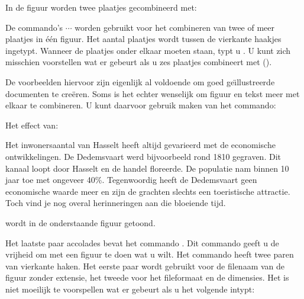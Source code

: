 In de figuur worden twee plaatjes gecombineerd met:


De commando's \type{\startcombinatie} $\cdots$
\type{\stopcombinatie} worden gebruikt voor het combineren
van twee of meer plaatjes in \'e\'en figuur. Het aantal
plaatjes wordt tussen de vierkante haakjes ingetypt. Wanneer
de plaatjes onder elkaar moeten staan, typt u \type{[1*2]}.
U kunt zich misschien voorstellen wat er gebeurt als u zes
plaatjes combineert met \type{[3*2]}
().

De voorbeelden hiervoor zijn eigenlijk al voldoende om goed
ge\"{\i}llustreerde documenten te cre\"eren. Soms is het echter
wenselijk om figuur en tekst meer met elkaar te combineren.
U kunt daarvoor gebruik maken van het commando:


Het effect van:

\startbuffer
{}
  {\externfiguur[ma-cb-18][breedte=.5\zetbreedte]}
  Het inwonersaantal van Hasselt heeft altijd
  gevarieerd met de economische ontwikkelingen. De
  Dedemsvaart werd bijvoorbeeld rond 1810 gegraven. Dit
  kanaal loopt door Hasselt en de handel floreerde. De
  populatie nam binnen 10 jaar toe met ongeveer 40\%.
  Tegenwoordig heeft de Dedemsvaart geen economische waarde
  meer en zijn de grachten slechts een toeristische
  attractie. Toch vind je nog overal herinneringen aan die
  bloeiende tijd.
\stopfiguurtekst
\stopbuffer

\typebuffer

wordt in de onderstaande figuur getoond.

\start
\steltolerantiein[zeersoepel]
\haalbuffer
\stop


Het laatste paar accolades bevat het commando
\type{\externfiguur}. Dit commando geeft u de vrijheid om
met een figuur te doen wat u wilt. Het commando
\type{\externfiguur} heeft twee paren van vierkante haken.
Het eerste paar wordt gebruikt voor de filenaam van de
figuur zonder extensie, het tweede voor het fileformaat en
de dimensies. Het is niet moeilijk te voorspellen wat er
gebeurt als u het volgende intypt:

\startbuffer[margefiguur]
\inmarge
  {\externfiguur
     [ma-cb-23]
     [breedte=\margebreedte]}
\stopbuffer

\typebuffer[margefiguur]

